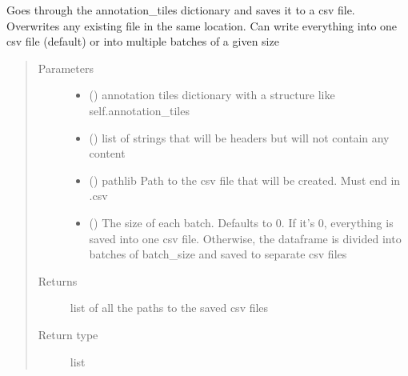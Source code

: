 \documentclass[letterpaper,10pt,english]{sphinxmanual}
\begin{document}
\begin{fulllineitems}
\begin{fulllineitems}
Goes through the annotation\_tiles dictionary and saves it to a csv file. Overwrites any existing file in
the same location. Can write everything into one csv file (default) or into multiple batches of a given size
\begin{quote}\begin{description}
\item[{Parameters}] \leavevmode\begin{itemize}
\item {} 
 () \textendash{} annotation tiles dictionary with a structure like self.annotation\_tiles

\item {} 
 () \textendash{} list of strings that will be headers but will not contain any content

\item {} 
 () \textendash{} pathlib Path to the csv file that will be created. Must end in .csv

\item {} 
 () \textendash{} The size of each batch. Defaults to 0. If it’s 0, everything is saved into one csv file.
Otherwise, the dataframe is divided into batches of batch\_size and saved to separate csv files

\end{itemize}

\item[{Returns}] \leavevmode
list of all the paths to the saved csv files

\item[{Return type}] \leavevmode
list

\end{description}\end{quote}

\end{fulllineitems}


\end{fulllineitems}


\begin{fulllineitems}
\label{\detokenize{index:sites_of_interest_parser.XmlParsingFailed}}
\end{fulllineitems}
\end{document}
